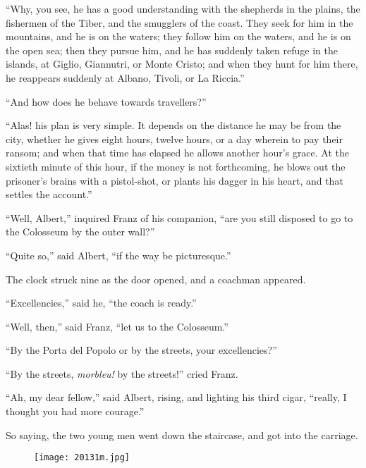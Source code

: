 “Why, you see, he has a good understanding with the shepherds in the
plains, the fishermen of the Tiber, and the smugglers of the coast.
They seek for him in the mountains, and he is on the waters; they
follow him on the waters, and he is on the open sea; then they pursue
him, and he has suddenly taken refuge in the islands, at Giglio,
Giannutri, or Monte Cristo; and when they hunt for him there, he
reappears suddenly at Albano, Tivoli, or La Riccia.”

“And how does he behave towards travellers?”

“Alas! his plan is very simple. It depends on the distance he may be
from the city, whether he gives eight hours, twelve hours, or a day
wherein to pay their ransom; and when that time has elapsed he allows
another hour’s grace. At the sixtieth minute of this hour, if the money
is not forthcoming, he blows out the prisoner’s brains with a
pistol-shot, or plants his dagger in his heart, and that settles the
account.”

“Well, Albert,” inquired Franz of his companion, “are you still
disposed to go to the Colosseum by the outer wall?”

“Quite so,” said Albert, “if the way be picturesque.”

The clock struck nine as the door opened, and a coachman appeared.

“Excellencies,” said he, “the coach is ready.”

“Well, then,” said Franz, “let us to the Colosseum.”

“By the Porta del Popolo or by the streets, your excellencies?”

“By the streets, \textit{morbleu!} by the streets!” cried Franz.

“Ah, my dear fellow,” said Albert, rising, and lighting his third
cigar, “really, I thought you had more courage.”

So saying, the two young men went down the staircase, and got into the
carriage.

\begin{figure}[h]
\texttt{[image: 20131m.jpg]}
\end{figure}
